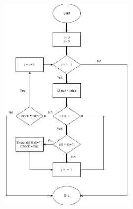 \documentclass[11pt,a4paper]{article}
\begin{document}
{\begin{enumerate}[label=\textbf{\arabic*})]
\begin{figure}[H]
						\includegraphics[width=0.6\textwidth]{BubbleSortFlowchart}
					\end{figure}
					

\end{enumerate}}
\end{document}
